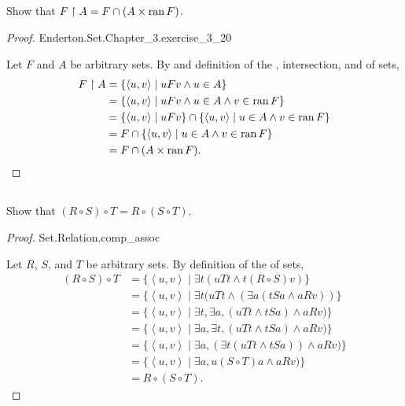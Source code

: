 \documentclass{report}
\begin{document}
\subsection{}%
\label{sub:exercise-3.20}

Show that $F \restriction A = F \cap (A \times \mathop{\text{ran}}{F})$.

\begin{proof}

    {Enderton.Set.Chapter\_3.exercise\_3\_20}

  Let $F$ and $A$ be arbitrary sets.
  By  and definition of the ,
    intersection, and  of sets,
    \begin{align*}
      F \restriction A
        & = \{\left< u, v \right> \mid uFv \land u \in A\} \\
        & = \{\left< u, v \right> \mid
          uFv \land u \in A \land v \in \mathop{\text{ran}}{F}\} \\
        & = \{\left< u, v \right> \mid uFv\} \cap
          \{\left< u, v \right> \mid u \in A \land v \in \mathop{\text{ran}}{F}\} \\
        & = F \cap \{\left< u, v \right> \mid u \in A \land v \in \mathop{\text{ran}}{F}\} \\
        & = F \cap (A \times \mathop{\text{ran}}{F}).
    \end{align*}

\end{proof}

\subsection{}%
\label{sub:exercise-3.21}

Show that $(R \circ S) \circ T = R \circ (S \circ T)$.

\begin{proof}

    {Set.Relation.comp\_assoc}

  Let $R$, $S$, and $T$ be arbitrary sets.
  By definition of the  of sets,
    \begin{align*}
      (R \circ S) \circ T
        & = \{\left< u, v \right> \mid
          \exists t(uTt \land t(R \circ S)v)\} \\
        & = \{\left< u, v \right> \mid
          \exists t(uTt \land (\exists a(tSa \land aRv))\} \\
        & = \{\left< u, v \right> \mid
          \exists t, \exists a, (uTt \land tSa) \land aRv)\} \\
        & = \{\left< u, v \right> \mid
          \exists a, \exists t, (uTt \land tSa) \land aRv)\} \\
        & = \{\left< u, v \right> \mid
          \exists a, (\exists t(uTt \land tSa)) \land aRv)\} \\
        & = \{\left< u, v \right> \mid
          \exists a, u(S \circ T)a \land aRv)\} \\
        & = R \circ (S \circ T).
    \end{align*}

\end{proof}
\end{document}
